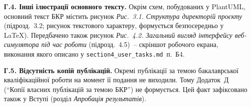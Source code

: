 \documentclass[
]{article}
\begin{document}
\textbf{Г.4. Інші ілюстрації основного тексту.} Окрім схем, побудованих
у PlantUML, основний текст БКР містить рисунок \emph{Рис.~3.1.
Структура директорій проєкту} (підрозд.~3.2; рисунок текстового
характеру, формується безпосередньо у LaTeX). Передбачено також
рисунок \emph{Рис.~4.2. Загальний вигляд інтерфейсу веб-симулятора під
час роботи} (підрозд.~4.5)~-- скріншот робочого екрана, виконання
якого описано у \texttt{section4\_user\_tasks.md}~п.~Б4.

\textbf{Г.5. Відсутність копій публікацій.} Окремі публікації за темою
бакалаврської кваліфікаційної роботи на момент її подання не виходили.
Тому Додаток~Д (``Копії власних публікацій за темою БКР'') не
формується. Цей факт зафіксовано також у Вступі (розділ
\emph{Апробація результатів}).
\end{document}
